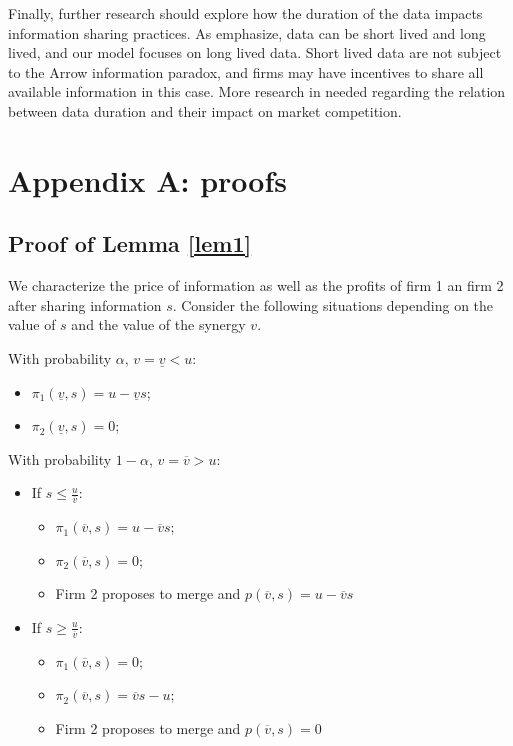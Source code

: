 \documentclass[a4paper,leqno]{article}%
\renewcommand{\a}{\alpha}
\newcommand{\uv}{\underline{v}}
\newcommand{\ov}{\overline{v}}
\begin{document}
Finally, further research should explore how the duration of the data impacts information sharing practices. As \cite{valavi2020time} emphasize, data can be short lived and long lived, and our model focuses on long lived data. Short lived data are not subject to the Arrow information paradox, and firms may have incentives to share all available information in this case. More research in needed regarding the relation between data duration and their impact on market competition.



\singlespacing






\appendix


\section{Appendix A: proofs}

\subsection{Proof of Lemma \ref{lem1}}\label{lem1p}

We characterize the price of information as well as the profits of firm 1 an firm 2 after sharing information $s$. Consider the following situations depending on the value of $s$ and the value of the synergy $v$.

With probability $\a$, $v=\uv<u$:

\begin{itemize}
    \item $\pi_1(\uv,s)=u-\uv s$;
    \item $\pi_2(\uv,s)=0$;
\end{itemize}

With probability $1-\a$, $v=\ov>u$:

\begin{itemize}
    \item If $s\leq \frac{u}{\ov}$:
\begin{itemize}
    \item $\pi_1(\ov,s)=u-\ov s$;
    \item $\pi_2(\ov,s)=0$;
    \item Firm 2 proposes to merge and $p(\ov,s)=u-\ov s$
\end{itemize}
    \item If $s\geq \frac{u}{\ov}$:
\begin{itemize}
    \item $\pi_1(\ov,s)=0$;
    \item $\pi_2(\ov,s)=\ov s-u$;
    \item Firm 2 proposes to merge and $p(\ov,s)=0$
\end{itemize}
\end{itemize}
\end{document}
